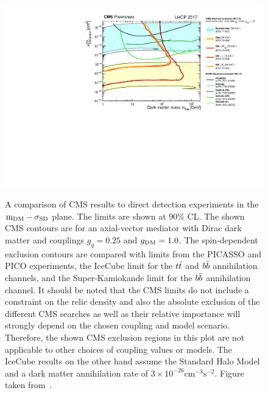 \begin{figure}[ht]
  \centering
  \includegraphics[width=\textwidth]{SD_CMSDD_Summary.pdf}\\
  \caption{A comparison of \protect \acs{CMS} results to direct detection experiments in the $\protect\mathrm{m_{DM}}-\sigma_{\mathrm{SD}}$ plane. The limits are shown at $90\%$ CL. The shown \protect \acs{CMS} contours are for an axial-vector mediator with Dirac dark matter and couplings $g_q=0.25$ and $\protect g_{\mathrm{DM}} = 1.0$. The spin-dependent exclusion contours are compared with limits from the PICASSO and PICO experiments, the IceCube limit for the $\protect t\bar{t}$ and $\protect b\bar{b}$ annihilation channels, and the Super-Kamiokande limit for the $\protect b\bar{b}$ annihilation channel.  It should be noted that the \protect \acs{CMS} limits do not include a constraint on the relic density and also the absolute exclusion of the different \protect \acs{CMS} searches as well as their relative importance will strongly depend on the chosen coupling and model scenario.  Therefore, the shown \protect  \acs{CMS} exclusion regions in this plot are not applicable to other choices of coupling values or models. The IceCube results on the other hand assume the Standard Halo Model and a dark matter annihilation rate of $3 \times 10^{-26} \mathrm{cm}^{-3}\mathrm{s}^{-2}$. Figure taken from~\cite{DMsummary}.}
  \label{fig:summary_SD}
\end{figure}


